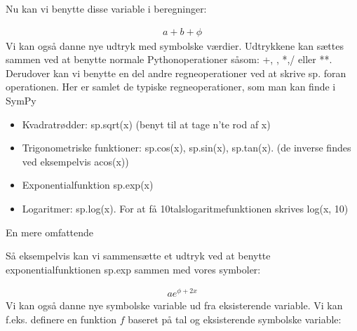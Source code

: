 \documentclass[letterpaper,10pt,english]{jupyterBook}
\begin{document}
\begin{sphinxVerbatim}[commandchars=\\\{\}]
      
\end{sphinxVerbatim}

Nu kan vi benytte disse variable i beregninger:

\begin{sphinxVerbatim}[commandchars=\\\{\}]
     
\end{sphinxVerbatim}
\begin{equation*}
\begin{split}\displaystyle a + b + \phi\end{split}
\end{equation*}
Vi kan også danne nye udtryk med symbolske værdier. Udtrykkene kan sættes sammen ved at benytte normale Python\sphinxhyphen{}operationer såsom: +, \sphinxhyphen{}, *,/ eller **. Derudover kan vi benytte en del andre regneoperationer ved at skrive sp. foran operationen.
Her er samlet de typiske regneoperationer, som man kan finde i SymPy
\begin{itemize}
\item {} 
Kvadratrødder: sp.sqrt(x) (benyt  til at tage n’te rod af x)

\item {} 
Trigonometriske funktioner: sp.cos(x), sp.sin(x), sp.tan(x). (de inverse findes ved eksempelvis acos(x))

\item {} 
Exponentialfunktion sp.exp(x)

\item {} 
Logaritmer: sp.log(x). For at få 10\sphinxhyphen{}talslogaritmefunktionen skrives log(x, 10)

\end{itemize}

En mere omfattende 

Så eksempelvis kan vi sammensætte et udtryk ved at benytte exponentialfunktionen sp.exp sammen med vores symboler:

\begin{sphinxVerbatim}[commandchars=\\\{\}]
    
\end{sphinxVerbatim}
\begin{equation*}
\begin{split}\displaystyle a e^{\phi + 2 x}\end{split}
\end{equation*}
Vi kan også danne nye symbolske variable ud fra eksisterende variable. Vi kan f.eks. definere en funktion \(f\) baseret på tal og eksisterende symbolske variable:
\end{document}
